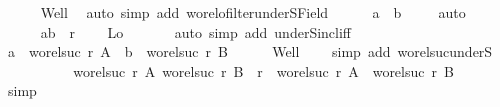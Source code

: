 \begin{isabellebody}
\ \ \ \ \isamarkupfalse%
\ Well\ \isamarkupfalse%
\ {\isacharparenleft}{\kern0pt}auto\ simp\ add{\isacharcolon}{\kern0pt}\ wo{\isacharunderscore}{\kern0pt}rel{\isachardot}{\kern0pt}ofilter{\isacharunderscore}{\kern0pt}underS{\isacharunderscore}{\kern0pt}Field{\isacharparenright}{\kern0pt}\isanewline
\ \ \ \ \isamarkupfalse%
\ {\isachardoublequoteopen}a\ {\isasymnoteq}\ b{\isachardoublequoteclose}\ \isamarkupfalse%
\ {\isacharasterisk}{\kern0pt}{\isacharasterisk}{\kern0pt}{\isacharasterisk}{\kern0pt}\ \isamarkupfalse%
\ auto\isanewline
\ \ \ \ \isamarkupfalse%
\isanewline
\ \ \ \ \isamarkupfalse%
\ {\isachardoublequoteopen}{\isacharparenleft}{\kern0pt}a{\isacharcomma}{\kern0pt}b{\isacharparenright}{\kern0pt}\ {\isasymin}\ r{\isachardoublequoteclose}\ \isamarkupfalse%
\ {}\ {}\ Lo\ {\isacharasterisk}{\kern0pt}{\isacharasterisk}{\kern0pt}{\isacharasterisk}{\kern0pt}\isanewline
\ \ \ \ \isamarkupfalse%
\ {\isacharparenleft}{\kern0pt}auto\ simp\ add{\isacharcolon}{\kern0pt}\ underS{\isacharunderscore}{\kern0pt}incl{\isacharunderscore}{\kern0pt}iff{\isacharparenright}{\kern0pt}\isanewline
\ \ \ \ \isamarkupfalse%
\isanewline
\ \ \ \ \isamarkupfalse%
\ {\isachardoublequoteopen}a\ {\isacharequal}{\kern0pt}\ wo{\isacharunderscore}{\kern0pt}rel{\isachardot}{\kern0pt}suc\ r\ A\ {\isasymand}\ b\ {\isacharequal}{\kern0pt}\ wo{\isacharunderscore}{\kern0pt}rel{\isachardot}{\kern0pt}suc\ r\ B{\isachardoublequoteclose}\isanewline
\ \ \ \ \isamarkupfalse%
\ Well\ {}\ {}\ \isamarkupfalse%
\ {\isacharparenleft}{\kern0pt}simp\ add{\isacharcolon}{\kern0pt}\ wo{\isacharunderscore}{\kern0pt}rel{\isachardot}{\kern0pt}suc{\isacharunderscore}{\kern0pt}underS{\isacharparenright}{\kern0pt}\isanewline
\ \ \ \ \isamarkupfalse%
\isanewline
\ \ \ \ \isamarkupfalse%
\ {\isachardoublequoteopen}{\isacharparenleft}{\kern0pt}wo{\isacharunderscore}{\kern0pt}rel{\isachardot}{\kern0pt}suc\ r\ A{\isacharcomma}{\kern0pt}\ wo{\isacharunderscore}{\kern0pt}rel{\isachardot}{\kern0pt}suc\ r\ B{\isacharparenright}{\kern0pt}\ {\isasymin}\ r\ {\isasymand}\ wo{\isacharunderscore}{\kern0pt}rel{\isachardot}{\kern0pt}suc\ r\ A\ {\isasymnoteq}\ wo{\isacharunderscore}{\kern0pt}rel{\isachardot}{\kern0pt}suc\ r\ B{\isachardoublequoteclose}\isanewline
\ \ \ \ \isamarkupfalse%
\ simp\isanewline

\end{isabellebody}
